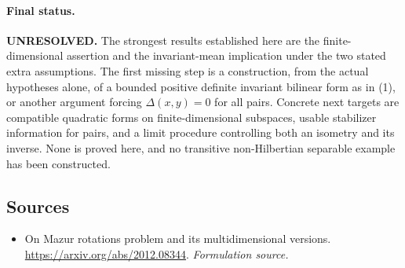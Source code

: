 \documentclass[11pt]{article}
\begin{document}
\paragraph{Final status.}
\textbf{UNRESOLVED.} The strongest results established here are the
finite-dimensional assertion and the invariant-mean implication under
the two stated extra assumptions. The first missing step is a
construction, from the actual hypotheses alone, of a bounded positive
definite invariant bilinear form as in (1), or another argument forcing
$\Delta(x,y)=0$ for all pairs. Concrete next targets are compatible
quadratic forms on finite-dimensional subspaces, usable stabilizer
information for pairs, and a limit procedure controlling both an
isometry and its inverse. None is proved here, and no transitive
non-Hilbertian separable example has been constructed.

\subsection{Sources}
\begin{itemize}
\item[S1]On Mazur rotations problem and its multidimensional versions.
\url{https://arxiv.org/abs/2012.08344}.
\textit{Formulation source.}
\end{itemize}
\end{document}
